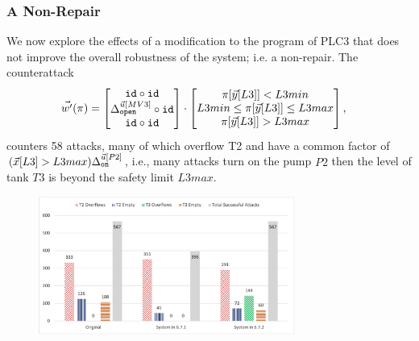 {{%
 
\subsubsection{A Non-Repair} 
\label{sec:CPSRobustness:NonRepair} We now explore the effects of a modification to the program of PLC3 that does not improve the overall robustness of the system; i.e. a non-repair. The counterattack 
\begin{align*}
    \vec{w'}(\pi)&=
    \begin{bmatrix}
     {\texttt{id}}\circ {\texttt{id}} \\
     {\Delta}^{\vec{u}[MV3]}_{\texttt{open}}\circ {\texttt{id}} \\
     {\texttt{id}}\circ {\texttt{id}} \\
    \end{bmatrix}
    \cdot
    \begin{bmatrix}
      \pi[\vec{y}[L3]]<L3min \\
      L3min \leq \pi[\vec{y}[L3]]\leq L3max \\
      \pi[\vec{y}[L3]]>L3max
    \end{bmatrix},
  \end{align*} 
counters 58 attacks, many of which overflow T2 and have a common factor of $(\vec{x}[L3]>L3max){\Delta}^{\vec{u}[P2]}_{\texttt{on}}$, i.e., many attacks turn on the pump $P2$ then the level of tank $T3$ is beyond the safety limit $L3max$. 
\begin{figure}[t]
  \centering
  \includegraphics[width=0.75\textwidth]{Figures/AttackDistribution.png} 

\end{figure}}}
